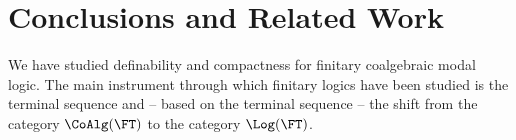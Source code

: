 \documentclass{entcs}
\begin{document}


\section{Conclusions and Related Work}

We have studied definability and compactness for finitary coalgebraic modal 
logic. The main instrument through which finitary logics have been studied 
is the terminal sequence and -- based on the terminal sequence -- the
shift from the category $\CoAlg(\FT)$ to the category $\Log(\FT)$.





\end{document}
